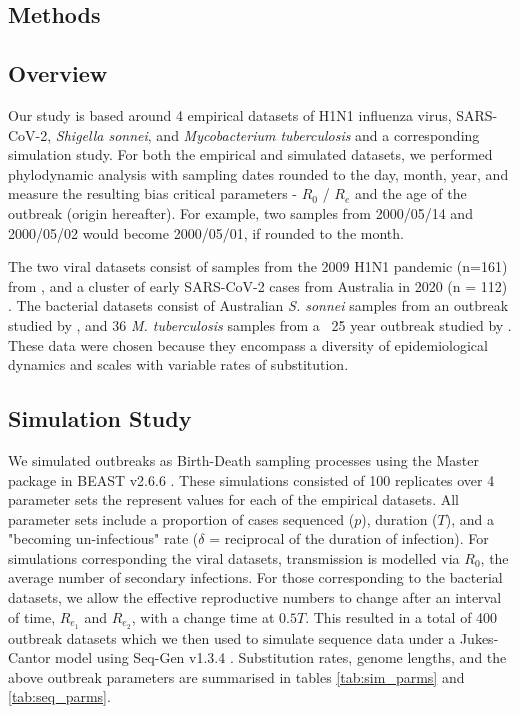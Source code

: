 \documentclass{article}
\begin{document}
\begin{spacing}{1.5}
\section*{Methods}
\subsection*{Overview}
Our study is based around 4 empirical datasets of H1N1 influenza virus, SARS-CoV-2, \textit{Shigella sonnei}, and \textit{Mycobacterium tuberculosis} and a corresponding simulation study. For both the empirical and simulated datasets, we performed phylodynamic analysis with sampling dates rounded to the day, month, year, and measure the resulting bias critical parameters - $R_0$ / $R_e$ and the age of the outbreak (origin hereafter). For example, two samples from 2000/05/14 and 2000/05/02 would become 2000/05/01, if rounded to the month.

The two viral datasets consist of samples from the 2009 H1N1 pandemic (n=161) from \citet{hedge_2013_real-time}, and a cluster of early SARS-CoV-2 cases from  Australia in 2020 (n = 112) \citep{lane2021genomics}. The bacterial datasets consist of Australian \textit{S. sonnei} samples from an outbreak studied by \citet{ingle_co-circulation_2019}, and 36 \textit{M. tuberculosis} samples from a ~25 year outbreak studied by \citet{kuhnert_tuberculosis_2018}. These data were chosen because they encompass a diversity of epidemiological dynamics and scales with variable rates of substitution.

\subsection*{Simulation Study}
We simulated outbreaks as Birth-Death sampling processes using the Master package in BEAST v2.6.6 \citep{vaughan_stochastic_2013,bouckaert_beast_2019}. These simulations consisted of 100 replicates over 4 parameter sets the represent values for each of the empirical datasets. All parameter sets include a proportion of cases sequenced ($p$), duration ($T$), and a "becoming un-infectious" rate ($\delta$ = reciprocal of the duration of infection). For simulations corresponding the viral datasets, transmission is modelled via $R_0$, the average number of secondary infections. For those corresponding to the bacterial datasets, we allow the effective reproductive numbers to change after an interval of time, $R_{e_1}$ and $R_{e_2}$, with a change time at $0.5T$. This resulted in a total of 400 outbreak datasets which we then used to simulate sequence data under a Jukes-Cantor model using Seq-Gen v1.3.4 \citep{rambaut_seq-gen_1997}. Substitution rates, genome lengths, and the above outbreak parameters are summarised in tables \ref{tab:sim_parms} and \ref{tab:seq_parms}.


\end{spacing}
\end{document}
